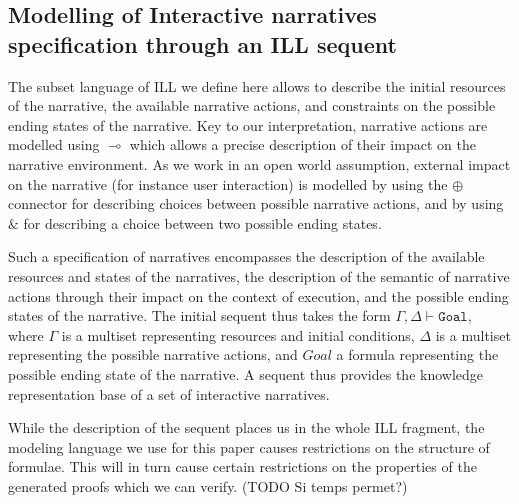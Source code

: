 \documentclass[runningheads,a4paper]{llncs}
\begin{document}
\subsection{Modelling of Interactive narratives specification through an ILL sequent\label{subsec:narrative_to_sequent}}
%
The subset language of ILL we define here allows to describe the initial resources of the narrative, the available narrative actions, and constraints on the possible ending states of the narrative. Key to our interpretation, narrative actions are modelled using $\multimap$ which allows a precise description of their impact on the narrative environment. As we work in an open world assumption, external impact on the narrative (for instance user interaction) is modelled by using the $\oplus$ connector for describing choices between possible narrative actions, and by using $\&$ for describing a choice between two possible ending states.

Such a specification of narratives encompasses the description of the available resources and states of the narratives, the description of the semantic of narrative actions through their impact on the context of execution, and the possible ending states of the narrative. The initial sequent thus takes the form $\Gamma , \Delta \vdash \mathtt{Goal}$, where $\Gamma$ is a multiset representing resources and initial conditions, $\Delta$ is a multiset representing the possible narrative actions, and $Goal$ a formula representing the possible ending state of the narrative. A sequent thus provides the knowledge representation base of a set of interactive narratives. 

While the description of the sequent places us in the whole ILL fragment, the modeling language we use for this paper causes restrictions on the structure of formulae. This will in turn cause certain restrictions on the properties of the generated proofs which we can verify. (TODO Si temps permet?)
\end{document}
